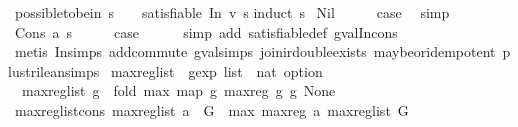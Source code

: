 \begin{isabellebody}
\isanewline
%
\endisadelimproof
\isanewline
{}\isamarkupfalse%
\ possible{\isacharunderscore}to{\isacharunderscore}be{\isacharunderscore}in{\isacharcolon}\ {\isachardoublequoteopen}s\ {\isasymnoteq}\ {\isacharbrackleft}{\isacharbrackright}\ {\isasymLongrightarrow}\ satisfiable\ {\isacharparenleft}In\ v\ s{\isacharparenright}{\isachardoublequoteclose}\isanewline
%
\isadelimproof
%
\endisadelimproof
%
\isatagproof
{}\isamarkupfalse%
{\isacharparenleft}induct\ s{\isacharparenright}\isanewline
{}\isamarkupfalse%
\ Nil\isanewline
\ \ \isamarkupfalse%
\ \isamarkupfalse%
\ {\isacharquery}case\ \isamarkupfalse%
\ simp\isanewline
{}\isamarkupfalse%
\isanewline
\ \ \isamarkupfalse%
\ {\isacharparenleft}Cons\ a\ s{\isacharparenright}\isanewline
\ \ \isamarkupfalse%
\ \isamarkupfalse%
\ {\isacharquery}case\isanewline
\ \ \ \ \isamarkupfalse%
\ {\isacharparenleft}simp\ add{\isacharcolon}\ satisfiable{\isacharunderscore}def\ gval{\isacharunderscore}In{\isacharunderscore}cons{\isacharparenright}\isanewline
\ \ \ \ \isamarkupfalse%
\ {\isacharparenleft}metis\ In{\isachardot}simps{\isacharparenleft}{}{\isacharparenright}\ add{\isachardot}commute\ gval{\isachardot}simps{\isacharparenleft}{}{\isacharparenright}\ join{\isacharunderscore}ir{\isacharunderscore}double{\isacharunderscore}exists\ maybe{\isacharunderscore}or{\isacharunderscore}idempotent\ plus{\isacharunderscore}trilean{\isachardot}simps{\isacharparenleft}{}{\isacharparenright}{\isacharparenright}\isanewline
{}\isamarkupfalse%
%
\endisatagproof
{\isafoldproof}%
%
\isadelimproof
\isanewline
%
\endisadelimproof
\isanewline
{}\isamarkupfalse%
\ max{\isacharunderscore}reg{\isacharunderscore}list\ {\isacharcolon}{\isacharcolon}\ {\isachardoublequoteopen}gexp\ list\ {\isasymRightarrow}\ nat\ option{\isachardoublequoteclose}\ \isanewline
\ \ {\isachardoublequoteopen}max{\isacharunderscore}reg{\isacharunderscore}list\ g\ {\isacharequal}\ {\isacharparenleft}fold\ max\ {\isacharparenleft}map\ {\isacharparenleft}{\isasymlambda}g{\isachardot}\ max{\isacharunderscore}reg\ g{\isacharparenright}\ g{\isacharparenright}\ None{\isacharparenright}{\isachardoublequoteclose}\isanewline
\isanewline
{}\isamarkupfalse%
\ max{\isacharunderscore}reg{\isacharunderscore}list{\isacharunderscore}cons{\isacharcolon}\ {\isachardoublequoteopen}max{\isacharunderscore}reg{\isacharunderscore}list\ {\isacharparenleft}a\ {\isacharhash}\ G{\isacharparenright}\ {\isacharequal}\ max\ {\isacharparenleft}max{\isacharunderscore}reg\ a{\isacharparenright}\ {\isacharparenleft}max{\isacharunderscore}reg{\isacharunderscore}list\ G{\isacharparenright}{\isachardoublequoteclose}\isanewline

\end{isabellebody}
